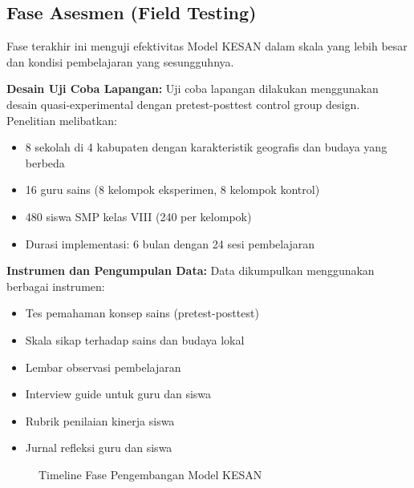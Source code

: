 \documentclass[12pt,a4paper,oneside]{book}
\begin{document}
\subsection{Fase Asesmen (Field Testing)}

Fase terakhir ini menguji efektivitas Model KESAN dalam skala yang lebih besar dan kondisi pembelajaran yang sesungguhnya.

\textbf{Desain Uji Coba Lapangan:}
Uji coba lapangan dilakukan menggunakan desain quasi-experimental dengan pretest-posttest control group design. Penelitian melibatkan:
\begin{itemize}
\item 8 sekolah di 4 kabupaten dengan karakteristik geografis dan budaya yang berbeda
\item 16 guru sains (8 kelompok eksperimen, 8 kelompok kontrol)
\item 480 siswa SMP kelas VIII (240 per kelompok)
\item Durasi implementasi: 6 bulan dengan 24 sesi pembelajaran
\end{itemize}

\textbf{Instrumen dan Pengumpulan Data:}
Data dikumpulkan menggunakan berbagai instrumen:
\begin{itemize}
\item Tes pemahaman konsep sains (pretest-posttest)
\item Skala sikap terhadap sains dan budaya lokal
\item Lembar observasi pembelajaran
\item Interview guide untuk guru dan siswa
\item Rubrik penilaian kinerja siswa
\item Jurnal refleksi guru dan siswa
\end{itemize}

\begin{figure}[H]
  \centering
  \caption{Timeline Fase Pengembangan Model KESAN}
  \label{fig:metodologi_timeline}
\end{figure}
\end{document}
